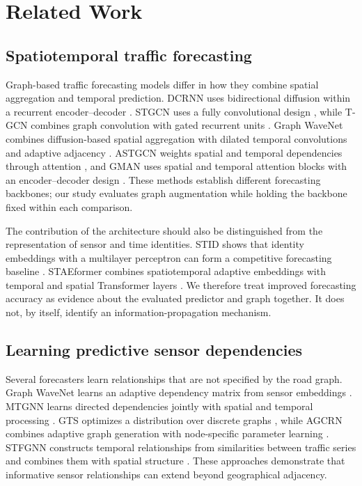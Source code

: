\section{Related Work}\label{sec:related}

\subsection{Spatiotemporal traffic forecasting}
Graph-based traffic forecasting models differ in how they combine spatial aggregation and temporal prediction. DCRNN uses bidirectional diffusion within a recurrent encoder--decoder \cite{li2018dcrnn}. STGCN uses a fully convolutional design \cite{yu2018stgcn}, while T-GCN combines graph convolution with gated recurrent units \cite{zhao2020tgcn}. Graph WaveNet combines diffusion-based spatial aggregation with dilated temporal convolutions and adaptive adjacency \cite{wu2019graphwavenet}. ASTGCN weights spatial and temporal dependencies through attention \cite{guo2019astgcn}, and GMAN uses spatial and temporal attention blocks with an encoder--decoder design \cite{zheng2020gman}. These methods establish different forecasting backbones; our study evaluates graph augmentation while holding the backbone fixed within each comparison.

The contribution of the architecture should also be distinguished from the representation of sensor and time identities. STID shows that identity embeddings with a multilayer perceptron can form a competitive forecasting baseline \cite{shao2022stid}. STAEformer combines spatiotemporal adaptive embeddings with temporal and spatial Transformer layers \cite{liu2023staeformer}. We therefore treat improved forecasting accuracy as evidence about the evaluated predictor and graph together. It does not, by itself, identify an information-propagation mechanism.

\subsection{Learning predictive sensor dependencies}
Several forecasters learn relationships that are not specified by the road graph. Graph WaveNet learns an adaptive dependency matrix from sensor embeddings \cite{wu2019graphwavenet}. MTGNN learns directed dependencies jointly with spatial and temporal processing \cite{wu2020mtgnn}. GTS optimizes a distribution over discrete graphs \cite{shang2021gts}, while AGCRN combines adaptive graph generation with node-specific parameter learning \cite{bai2020agcrn}. STFGNN constructs temporal relationships from similarities between traffic series and combines them with spatial structure \cite{li2021stfgnn}. These approaches demonstrate that informative sensor relationships can extend beyond geographical adjacency.

